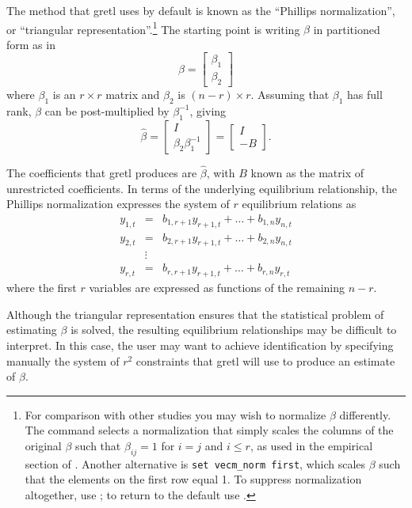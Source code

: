 The method that gretl uses by default is known as the ``Phillips
normalization'', or ``triangular representation''.\footnote{For
comparison with other studies you may wish to normalize $\beta$
differently.  The command  selects a
normalization that simply scales the columns of the original $\beta$
such that $\beta_{ij} = 1$ for $i=j$ and $i \leq r$, as used in the
empirical section of \cite{boswijk-doornik04}.  Another alternative is
\verb+set vecm_norm first+, which scales $\beta$ such that the
elements on the first row equal 1.  To suppress normalization
altogether, use ; to return to the default use
.} The starting point is writing $\beta$
in partitioned form as in
\[
  \beta = \left[
    \begin{array}{c} \beta_1 \\ \beta_2  \end{array}
    \right]
\]
where $\beta_1$ is an $r \times r$ matrix and  $\beta_2$ is $(n-r)
\times r$. Assuming that $\beta_1$ has full rank, $\beta$ can be
post-multiplied by $\beta_1^{-1}$, giving
\[
  \hat{\beta} = \left[
    \begin{array}{c} I \\ \beta_2 \beta_1^{-1}  \end{array}
    \right] =
    \left[
    \begin{array}{c} I \\ -B \end{array}
  \right].
\]

The coefficients that gretl produces are $\hat{\beta}$, with
$B$ known as the matrix of unrestricted coefficients. In
terms of the underlying equilibrium relationship, the Phillips
normalization expresses the system of $r$ equilibrium relations as
  \begin{eqnarray*}
    y_{1,t} & = & b_{1,r+1} y_{r+1,t} + \ldots + b_{1,n} y_{n,t} \\
    y_{2,t} & = & b_{2,r+1} y_{r+1,t} + \ldots + b_{2,n} y_{n,t} \\
    & \vdots & \\
    y_{r,t} & = & b_{r,r+1} y_{r+1,t} + \ldots + b_{r,n} y_{r,t} 
  \end{eqnarray*}
where the first $r$ variables are expressed as functions of the
remaining $n-r$.

Although the triangular representation ensures that the statistical
problem of estimating $\beta$ is solved, the resulting equilibrium
relationships may be difficult to interpret. In this case, the user
may want to achieve identification by specifying manually the system
of $r^2$ constraints that gretl will use to produce an estimate
of $\beta$.

